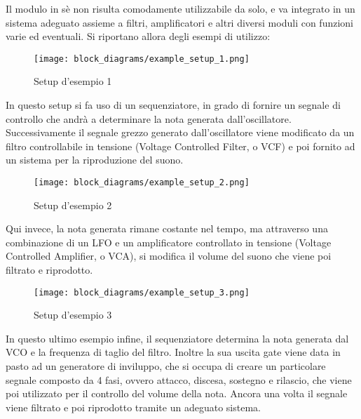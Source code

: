 Il modulo in sè non risulta comodamente utilizzabile da solo, e va integrato in un sistema
adeguato assieme a filtri, amplificatori e altri diversi moduli con funzioni varie ed eventuali.
Si riportano allora degli esempi di utilizzo:

\begin{figure}[H]
    \centering
    \texttt{[image: block\_diagrams/example\_setup\_1.png]}
    \caption{Setup d'esempio 1}
    \label{example_setup_1}
\end{figure}

In questo setup si fa uso di un sequenziatore, in grado di fornire un segnale di controllo
che andrà a determinare la nota generata dall'oscillatore. Successivamente il segnale grezzo
generato dall'oscillatore viene modificato da un filtro controllabile in tensione (Voltage
Controlled Filter, o VCF) e poi fornito ad un sistema per la riproduzione del suono.

\begin{figure}[H]
    \centering
    \texttt{[image: block\_diagrams/example\_setup\_2.png]}
    \caption{Setup d'esempio 2}
    \label{example_setup_2}
\end{figure}

Qui invece, la nota generata rimane costante nel tempo, ma attraverso una combinazione di un
LFO e un amplificatore controllato in tensione (Voltage Controlled Amplifier, o VCA), si
modifica il volume del suono che viene poi filtrato e riprodotto.

\begin{figure}[H]
    \centering
    \texttt{[image: block\_diagrams/example\_setup\_3.png]}
    \caption{Setup d'esempio 3}
    \label{example_setup_3}
\end{figure}

In questo ultimo esempio infine, il sequenziatore determina la nota generata dal VCO e la
frequenza di taglio del filtro. Inoltre la sua uscita gate viene data in pasto ad un generatore
di inviluppo, che si occupa di creare un particolare segnale composto da 4 fasi, ovvero attacco,
discesa, sostegno e rilascio, che viene poi utilizzato per il controllo del volume della nota.
Ancora una volta il segnale viene filtrato e poi riprodotto tramite un adeguato sistema.





